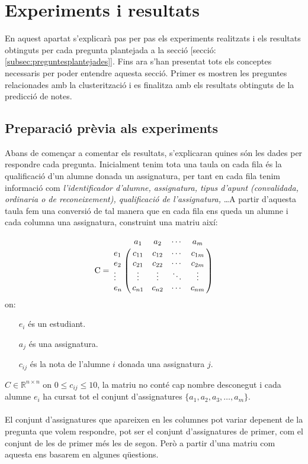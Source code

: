 \documentclass[12pt,a4paper,catalan]{article}
\begin{document}

\newpage

\section{Experiments i resultats}
\label{sec:experimentsiresultats}
En aquest apartat s'explicarà pas per pas els experiments realitzats i els resultats obtinguts per cada pregunta plantejada a la secció [secció:\ref{subsec:preguntesplantejades}]. Fins ara s'han presentat tots els conceptes necessaris per poder entendre aquesta secció. Primer es mostren les preguntes relacionades amb la clusterització i es finalitza amb els resultats obtinguts de la predicció de notes.

\subsection{Preparació prèvia als experiments}
Abans de començar a comentar els resultats, s'explicaran quines són les dades per respondre cada pregunta. Inicialment tenim tota una taula on cada fila és la qualificació d'un alumne donada un assignatura, per tant en cada fila tenim informació com \textit{l'identificador d'alumne, assignatura, tipus d'apunt (convalidada, ordinaria o de reconeixement), qualificació de l'assignatura,} \ldots A partir d'aquesta taula fem una conversió de tal manera que en cada fila ens queda un alumne i cada columna una assignatura, construint una matriu així:

$$
\mathrm{C} = \bordermatrix{ &         a_1   &    a_2   &   \cdots    &    a_m  \cr
                  e_1    &  c_{11}  &  c_{12}  &   \cdots    &  c_{1m} \cr
                  e_2    &  c_{21}  &  c_{22}  &   \cdots    &  c_{2m}    \cr
                  \vdots &  \vdots  &  \vdots  &   \ddots    &  \vdots \cr
                  e_n    &  c_{n1}  &  c_{n2}  &   \cdots    &  c_{nm} \cr
                  }
$$
on:
\begin{itemize}[leftmargin=.5in]
	\item [$e_i$] és un estudiant.
	\item [$a_j$] és una assignatura.
	\item [$c_{ij}$] és la nota de l'alumne $i$ donada una assignatura $j$.
\end{itemize}

$C\in \mathbb{R}^{n \times n}$ on $0 \leq c_{ij} \leq 10$, la matriu no conté cap nombre desconegut i cada alumne $e_i$ ha cursat tot el conjunt d'assignatures $\{a_1, a_2, a_3, \ldots, a_m\}$.
\\
\\
El conjunt d'assignatures que apareixen en les columnes pot variar depenent de la pregunta que volem respondre, pot ser el conjunt d'assignatures de primer, com el conjunt de les de primer més les de segon. Però a partir d'una matriu com aquesta ens basarem en algunes qüestions.
\end{document}
